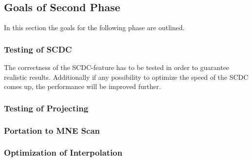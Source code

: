 \subsection{Goals of Second Phase}
In this section the goals for the following phase are outlined. 

\subsubsection{Testing of SCDC}
The correctness of the SCDC-feature has to be tested in order to guarantee realistic results. Additionally if any possibility to optimize the speed of the SCDC comes up, the performance will be improved further.
\subsubsection{Testing of Projecting}

\subsubsection{Portation to MNE Scan}
\subsubsection{Optimization of Interpolation}
